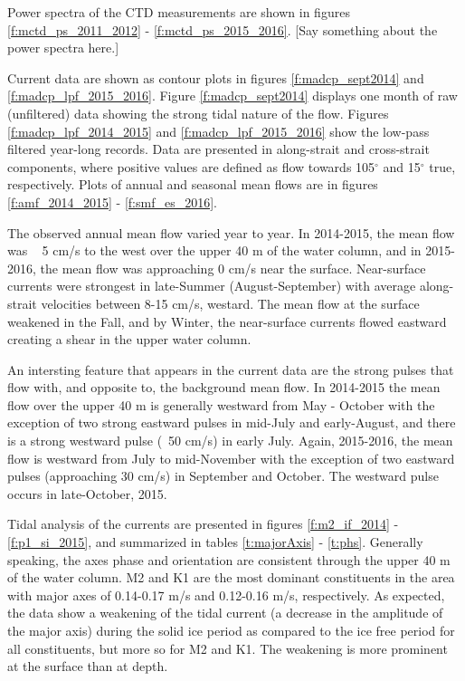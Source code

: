 \documentclass[12pt]{dforeport}
\begin{document}
Power spectra of the CTD measurements are shown in figures \ref{f:mctd_ps_2011_2012} - \ref{f:mctd_ps_2015_2016}. [Say something about the power spectra here.]

Current data are shown as contour plots in figures \ref{f:madcp_sept2014} and \ref{f:madcp_lpf_2015_2016}. Figure \ref{f:madcp_sept2014} displays one month of raw (unfiltered) data showing the strong tidal nature of the flow. Figures \ref{f:madcp_lpf_2014_2015} and \ref{f:madcp_lpf_2015_2016} show the low-pass filtered year-long records. Data are presented in along-strait and cross-strait components, where positive values are defined as flow towards 105$^{\circ}$ and 15$^{\circ}$ true, respectively. Plots of annual and seasonal mean flows are in figures \ref{f:amf_2014_2015} - \ref{f:smf_es_2016}. 

The observed annual mean flow varied year to year. In 2014-2015, the mean flow was ~ 5 cm/s to the west over the upper 40 m of the water column, and in 2015-2016, the mean flow was approaching 0 cm/s near the surface. Near-surface currents were strongest in late-Summer (August-September) with average along-strait velocities between 8-15 cm/s, westard. The mean flow at the surface weakened in the Fall, and by Winter, the near-surface currents flowed eastward creating a shear in the upper water column.

An intersting feature that appears in the current data are the strong pulses that flow with, and opposite to, the background mean flow. In 2014-2015 the mean flow over the upper 40 m is generally westward from May - October with the exception of two strong eastward pulses in mid-July and early-August, and there is a strong westward pulse (~50 cm/s) in early July.
Again, 2015-2016, the mean flow is westward from July to mid-November with the exception of two eastward pulses (approaching 30 cm/s) in September and October. The westward pulse occurs in late-October, 2015. 
 
Tidal analysis of the currents are presented in figures \ref{f:m2_if_2014} -  \ref{f:p1_si_2015}, and summarized in tables \ref{t:majorAxis} - \ref{t:phs}. Generally speaking, the axes phase and orientation are consistent through the upper 40 m of the water column. M2 and K1 are the most dominant constituents in the area with major axes of 0.14-0.17 m/s and 0.12-0.16 m/s, respectively. As expected, the data show a weakening of the tidal current (a decrease in the amplitude of the major axis) during the solid ice period as compared to the ice free period for all constituents, but more so for M2 and K1. The weakening is more prominent at the surface than at depth.  
 
\end{document}

